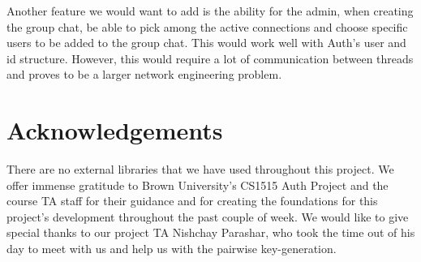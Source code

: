 \documentclass[sigconf]{acmart}
\begin{document}
Another feature we would want to add is the ability for the admin, when creating the group chat, be able to pick among the active connections and choose specific users to be added to the group chat. This would work well with Auth's user and id structure. However, this would require a lot of communication between threads and proves to be a larger network engineering problem. 
\section{Acknowledgements}

There are no external libraries that we have used throughout this project. We offer immense gratitude to Brown University's CS1515 Auth Project and the course TA staff for their guidance and for creating the foundations for this project's development throughout the past couple of week. We would like to give special thanks to our project TA Nishchay Parashar, who took the time out of his day to meet with us and help us with the pairwise key-generation. 
\end{document}
